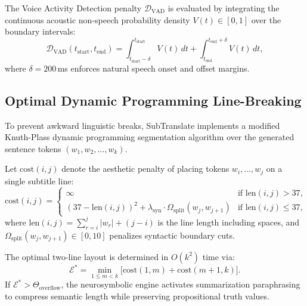\documentclass[11pt,a4paper,reqno]{article}
\theoremstyle{definition}
\theoremstyle{remark}
\begin{document}
The Voice Activity Detection penalty $\mathcal{D}_{\mathrm{VAD}}$ is evaluated by integrating the continuous acoustic non-speech probability density $V(t) \in [0, 1]$ over the boundary intervals:
\begin{equation}
\mathcal{D}_{\mathrm{VAD}}(t_{\mathrm{start}}, t_{\mathrm{end}}) = \int_{t_{\mathrm{start}} - \delta}^{t_{\mathrm{start}}} V(t)\,dt + \int_{t_{\mathrm{end}}}^{t_{\mathrm{end}} + \delta} V(t)\,dt,
\end{equation}
where $\delta = 200$\,ms enforces natural speech onset and offset margins.

\subsection{Optimal Dynamic Programming Line-Breaking}
To prevent awkward linguistic breaks, SubTranslate implements a modified Knuth-Plass dynamic programming segmentation algorithm \cite{knuth_plass_1981} over the generated sentence tokens $(w_1, w_2, \dots, w_k)$.

Let $\mathrm{cost}(i, j)$ denote the aesthetic penalty of placing tokens $w_i, \dots, w_j$ on a single subtitle line:
\begin{equation}
\mathrm{cost}(i, j) = \begin{cases}
\infty & \text{if } \mathrm{len}(i, j) > 37, \\
(37 - \mathrm{len}(i, j))^2 + \lambda_{\mathrm{syn}} \cdot \Omega_{\mathrm{split}}(w_j, w_{j+1}) & \text{if } \mathrm{len}(i, j) \le 37,
\end{cases}
\end{equation}
where $\mathrm{len}(i, j) = \sum_{r=i}^j |w_r| + (j - i)$ is the line length including spaces, and $\Omega_{\mathrm{split}}(w_j, w_{j+1}) \in [0, 10]$ penalizes syntactic boundary cuts.

The optimal two-line layout is determined in $O(k^2)$ time via:
\begin{equation}
\mathcal{E}^* = \min_{1 \le m < k} \bigl[ \mathrm{cost}(1, m) + \mathrm{cost}(m+1, k) \bigr].
\end{equation}
If $\mathcal{E}^* > \Theta_{\mathrm{overflow}}$, the neurosymbolic engine activates summarization paraphrasing to compress semantic length while preserving propositional truth values.
\end{document}
